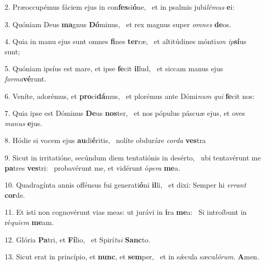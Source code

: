 2. Præoccupémus fáciem ejus in con\textbf{fes}si\textbf{ó}ne, \ast\  et in psalmis jubi\textit{lé}\textit{mus} \textbf{e}i:\

3. Quóniam Deus \textbf{ma}gnus \textbf{Dó}minus, \ast\  et rex magnus super \textit{om}\textit{nes} \textbf{de}os.\

4. Quia in manu ejus sunt omnes \textbf{fi}nes \textbf{ter}ræ, \ast\  et altitúdines mónti\textit{um} \textit{ip}\textbf{sí}us sunt;\

5. Quóniam ipsíus est mare, et ipse \textbf{fe}cit \textbf{il}lud, \ast\  et siccam manus ejus \textit{for}\textit{ma}\textbf{vé}runt.\

6. Veníte, adorémus, et \textbf{pro}ci\textbf{dá}mus, \ast\  et plorémus ante Dómi\textit{num} \textit{qui} \textbf{fe}cit nos:\

7. Quia ipse est Dóminus \textbf{De}us \textbf{nos}ter, \ast\  et nos pópulus páscuæ ejus, et oves \textit{ma}\textit{nus} \textbf{e}jus.\

8. Hódie si vocem ejus \textbf{au}di\textbf{é}ritis, \ast\  nolíte obduráre \textit{cor}\textit{da} \textbf{ves}tra\

9. Sicut in irritatióne, secúndum diem tentatiónis in desérto, \dag\  ubi tentavérunt me \textbf{pa}tres \textbf{ves}tri: \ast\  probavérunt me, et vidérunt ó\textit{pe}\textit{ra} \textbf{me}a.\

10. Quadragínta annis offénsus fui generati\textbf{ó}ni \textbf{il}li, \ast\  et dixi: Semper hi \textit{er}\textit{rant} \textbf{cor}de.\

11. Et isti non cognovérunt vias meas: ut jurávi in \textbf{i}ra \textbf{me}a: \ast\  Si introíbunt in ré\textit{qui}\textit{em} \textbf{me}am.\

12. Glória \textbf{Pa}tri, et \textbf{Fí}lio, \ast\  et Spirí\textit{tu}\textit{i} \textbf{Sanc}to.\

13. Sicut erat in princípio, et \textbf{nunc}, et \textbf{sem}per, \ast\  et in sǽcula sæcu\textit{ló}\textit{rum}. \textbf{A}men.\

